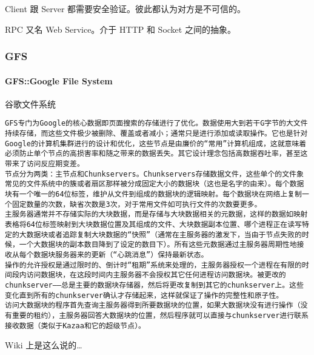 \documentclass[
]{article}
\begin{document}
Client 跟 Server 都需要安全验证。彼此都认为对方是不可信的。

RPC 又名 Web Service。介于 HTTP 和 Socket 之间的抽象。

\hypertarget{header-n172}{%
\subsubsection{GFS}\label{header-n172}}

\hypertarget{header-n173}{%
\paragraph{GFS::Google File System}\label{header-n173}}

谷歌文件系统

\begin{verbatim}
GFS专门为Google的核心数据即页面搜索的存储进行了优化。数据使用大到若干G字节的大文件持续存储，而这些文件极少被删除、覆盖或者减小；通常只是进行添加或读取操作。它也是针对Google的计算机集群进行的设计和优化，这些节点是由廉价的“常用”计算机组成，这就意味着必须防止单个节点的高损害率和随之带来的数据丢失。其它设计理念包括高数据吞吐率，甚至这带来了访问反应期变差。
节点分为两类：主节点和Chunkservers。Chunkservers存储数据文件，这些单个的文件象常见的文件系统中的簇或者扇区那样被分成固定大小的数据块（这也是名字的由来）。每个数据块有一个唯一的64位标签，维护从文件到组成的数据块的逻辑映射。每个数据块在网络上复制一个固定数量的次数，缺省次数是3次，对于常用文件如可执行文件的次数要更多。
主服务器通常并不存储实际的大块数据，而是存储与大块数据相关的元数据，这样的数据如映射表格将64位标签映射到大块数据位置及其组成的文件、大块数据副本位置、哪个进程正在读写特定的大数据块或者追踪复制大块数据的“快照”（通常在主服务器的激发下，当由于节点失败的时候，一个大数据块的副本数目降到了设定的数目下）。所有这些元数据通过主服务器周期性地接收从每个数据块服务器来的更新（“心跳消息”）保持最新状态。
操作的允许授权是通过限时的、倒计时“租期”系统来处理的，主服务器授权一个进程在有限的时间段内访问数据块，在这段时间内主服务器不会授权其它任何进程访问数据块。被更改的chunkserver——总是主要的数据块存储器，然后将更改复制到其它的chunkserver上。这些变化直到所有的chunkserver确认才存储起来，这样就保证了操作的完整性和原子性。
访问大数据块的程序首先查询主服务器得到所要数据块的位置，如果大数据块没有进行操作（没有重要的租约），主服务器回答大数据块的位置，然后程序就可以直接与chunkserver进行联系接收数据（类似于Kazaa和它的超级节点）。
\end{verbatim}

Wiki 上是这么说的\ldots{}
\end{document}
